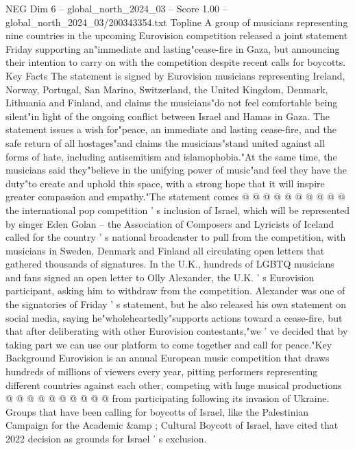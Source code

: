 \begin{textsample}{NEG Dim 6 – global\_north\_2024\_03 – Score 1.00 – global\_north\_2024\_03/200343354.txt}  \label{ex:f6_neg_399}
Topline A group of musicians representing nine countries in the upcoming Eurovision competition released a joint statement Friday supporting an"immediate and lasting"cease-fire in Gaza, but announcing their intention to carry on with the competition despite recent calls for boycotts.
Key Facts The statement is signed by Eurovision musicians representing Ireland, Norway, Portugal, San Marino, Switzerland, the United Kingdom, Denmark, Lithuania and Finland, and claims the musicians"do not feel comfortable being silent"in light of the ongoing conflict between Israel and Hamas in Gaza.
The statement issues a wish for"peace, an immediate and lasting cease-fire, and the safe return of all hostages"and claims the musicians"stand united against all forms of hate, including antisemitism and islamophobia."At the same time, the musicians said they"believe in the unifying power of music"and feel they have the duty"to create and uphold this space, with a strong hope that it will inspire greater compassion and empathy."The statement comes @ @ @ @ @ @ @ @ @ @ the international pop competition ' s inclusion of Israel, which will be represented by singer Eden Golan -- the Association of Composers and Lyricists of Iceland called for the country ' s national broadcaster to pull from the competition, with musicians in Sweden, Denmark and Finland all circulating open letters that gathered thousands of signatures.
In the U.K., hundreds of LGBTQ musicians and fans signed an open letter to Olly Alexander, the U.K. ' s Eurovision participant, asking him to withdraw from the competition.
Alexander was one of the signatories of Friday ' s statement, but he also released his own statement on social media, saying he"wholeheartedly"supports actions toward a cease-fire, but that after deliberating with other Eurovision contestants,"we ' ve decided that by taking part we can use our platform to come together and call for peace."Key Background Eurovision is an annual European music competition that draws hundreds of millions of viewers every year, pitting performers representing different countries against each other, competing with huge musical productions @ @ @ @ @ @ @ @ @ @ from participating following its invasion of Ukraine.
Groups that have been calling for boycotts of Israel, like the Palestinian Campaign for the Academic \&amp ; Cultural Boycott of Israel, have cited that 2022 decision as grounds for Israel ' s exclusion.

\end{textsample}
